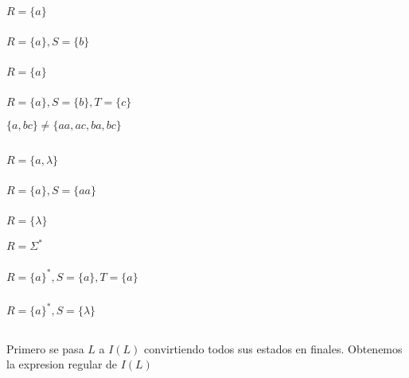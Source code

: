 \subsubsection{}
$R = \{a\}$

\subsubsection{}
$R = \{a\}, S = \{b\}$

\subsubsection{}
$R = \{a\}$

\subsubsection{}
$R = \{a\}, S = \{b\}, T = \{c\}$

$\{a, bc\} \neq \{aa, ac, ba, bc\}$

\subsection{}
\subsubsection{}
$R = \{a, \lambda\}$

\subsubsection{}
$R= \{a\}, S = \{aa\}$

\subsubsection{}
$R = \{\lambda\}$

$R = \Sigma^*$

\subsubsection{}
$R = \{a\}^*, S = \{a\}, T = \{a\}$

\subsubsection{}
$R = \{a\}^*, S = \{\lambda\}$

\subsection{}
Primero se pasa $L$ a $I(L)$ convirtiendo todos sus estados en finales. Obtenemos la expresion regular de $I(L)$

